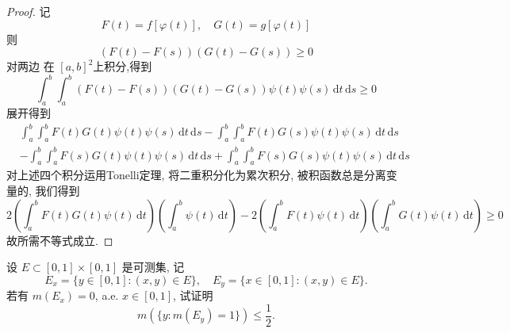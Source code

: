 \documentclass[../main.tex]{subfiles}
\begin{document}
\begin{proof}
  记 \[
  F\left( t \right)= f\left[  \varphi \left( t \right)  \right],\quad G\left( t \right)= g\left[  \varphi \left( t \right)  \right]    
  \]则 \[
  \left( F\left( t \right)-F\left( s \right)   \right)\left( G\left( t \right)-G\left( s \right)   \right)\ge 0  
  \]对两边 在 \(  \left[ a,b \right]^{2}   \)上积分,得到  \[
  \int_{a}^{b}\int_{a}^{b}\left( F\left( t \right)-F\left( s \right)   \right)\left( G\left( t \right)-G\left( s \right)   \right)\psi \left( t \right)\psi \left( s \right) \,\mathrm{d} t\,\mathrm{d} s   \ge 0
  \]展开得到 \[
\begin{aligned}
&  \int_{a}^{b}\int_{a}^{b}F\left( t \right)G\left( t \right)\psi \left( t \right)\psi \left( s \right)\,\mathrm{d} t\,\mathrm{d} s-\int_{a}^{b}\int_{a}^{b}F\left( t \right)G\left( s \right)\psi \left( t \right)\psi \left( s \right)\,\mathrm{d} t\,\mathrm{d} s   \\ 
 &-\int_{a}^{b}\int_{a}^{b}F\left( s \right)G\left( t \right)\psi \left( t \right)\psi \left( s \right)\,\mathrm{d} t\,\mathrm{d} s+ \int_{a}^{b}\int_{a}^{b}F\left( s \right)G\left( s \right)\psi \left( t \right)\psi \left( s \right)\,\mathrm{d} t\,\mathrm{d} s         
\end{aligned}       
  \]对上述四个积分运用Tonelli定理, 将二重积分化为累次积分, 被积函数总是分离变量的, 我们得到 \[
  2\left( \int_{a}^{b} F\left( t \right)G\left( t \right)\psi \left( t \right)\,\mathrm{d} t   \right)\left( \int_{a}^{b}\psi \left( t \right)\,\mathrm{d} t  \right)-2\left( \int_{a}^{b}F\left( t \right)\psi \left( t \right)\,\mathrm{d} t   \right)\left( \int_{a}^{b}G\left( t \right)\psi \left( t \right)\,\mathrm{d} t   \right)    \ge 0
  \]故所需不等式成立.
\end{proof}
\begin{exercise}{}{}
设 \(E\subset[0,1]\times[0,1]\) 是可测集, 记
\[
E_x=\{y\in[0,1]:(x,y)\in E\},\quad
E_y=\{x\in[0,1]:(x,y)\in E\}.
\]
若有 \(m(E_x)=0\), a.e. \(x\in[0,1]\), 试证明
\[
m(\{y:m(E_y)=1\})\le\frac12.
\]
\end{exercise}
\end{document}
